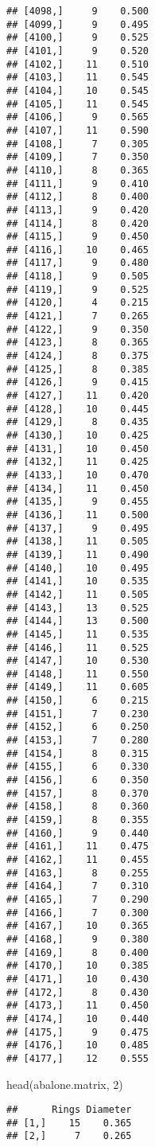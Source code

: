 \documentclass[
]{article}
\newenvironment{Shaded}{\begin{snugshade}}{\end{snugshade}}
\newcommand{\DecValTok}[1]{\textcolor[rgb]{0.00,0.00,0.81}{#1}}
\newcommand{\FunctionTok}[1]{\textcolor[rgb]{0.00,0.00,0.00}{#1}}
\newcommand{\NormalTok}[1]{#1}
\begin{document}
\begin{verbatim}
## [4098,]     9    0.500
## [4099,]     9    0.495
## [4100,]     9    0.525
## [4101,]     9    0.520
## [4102,]    11    0.510
## [4103,]    11    0.545
## [4104,]    10    0.545
## [4105,]    11    0.545
## [4106,]     9    0.565
## [4107,]    11    0.590
## [4108,]     7    0.305
## [4109,]     7    0.350
## [4110,]     8    0.365
## [4111,]     9    0.410
## [4112,]     8    0.400
## [4113,]     9    0.420
## [4114,]     8    0.420
## [4115,]     9    0.450
## [4116,]    10    0.465
## [4117,]     9    0.480
## [4118,]     9    0.505
## [4119,]     9    0.525
## [4120,]     4    0.215
## [4121,]     7    0.265
## [4122,]     9    0.350
## [4123,]     8    0.365
## [4124,]     8    0.375
## [4125,]     8    0.385
## [4126,]     9    0.415
## [4127,]    11    0.420
## [4128,]    10    0.445
## [4129,]     8    0.435
## [4130,]    10    0.425
## [4131,]    10    0.450
## [4132,]    11    0.425
## [4133,]    10    0.470
## [4134,]    11    0.450
## [4135,]     9    0.455
## [4136,]    11    0.500
## [4137,]     9    0.495
## [4138,]    11    0.505
## [4139,]    11    0.490
## [4140,]    10    0.495
## [4141,]    10    0.535
## [4142,]    11    0.505
## [4143,]    13    0.525
## [4144,]    13    0.500
## [4145,]    11    0.535
## [4146,]    11    0.525
## [4147,]    10    0.530
## [4148,]    11    0.550
## [4149,]    11    0.605
## [4150,]     6    0.215
## [4151,]     7    0.230
## [4152,]     6    0.250
## [4153,]     7    0.280
## [4154,]     8    0.315
## [4155,]     6    0.330
## [4156,]     6    0.350
## [4157,]     8    0.370
## [4158,]     8    0.360
## [4159,]     8    0.355
## [4160,]     9    0.440
## [4161,]    11    0.475
## [4162,]    11    0.455
## [4163,]     8    0.255
## [4164,]     7    0.310
## [4165,]     7    0.290
## [4166,]     7    0.300
## [4167,]    10    0.365
## [4168,]     9    0.380
## [4169,]     8    0.400
## [4170,]    10    0.385
## [4171,]    10    0.430
## [4172,]     8    0.430
## [4173,]    11    0.450
## [4174,]    10    0.440
## [4175,]     9    0.475
## [4176,]    10    0.485
## [4177,]    12    0.555
\end{verbatim}

\begin{Shaded}
\begin{Highlighting}[]
\FunctionTok{head}\NormalTok{(abalone.matrix, }\DecValTok{2}\NormalTok{)}
\end{Highlighting}
\end{Shaded}

\begin{verbatim}
##      Rings Diameter
## [1,]    15    0.365
## [2,]     7    0.265
\end{verbatim}
\end{document}

